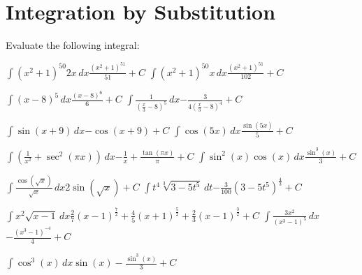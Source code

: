 
\section{Integration by Substitution}

\noindent Evaluate the following integral:

\pairofprobsans%
{$\displaystyle \int (x^2 + 1)^{50} 2x \,dx$}{$\displaystyle \frac{(x^2 + 1)^{51}}{51} + C$}%
{$\displaystyle \int (x^2 + 1)^{50} x \,dx$}{$\displaystyle \frac{(x^2 + 1)^{51}}{102} + C$}%

\pairofprobsans%
{$\displaystyle \int \left(x - 8\right)^5\,dx$}{$\displaystyle \frac{\left(x-8\right)^6}{6} + C$}%
{$\displaystyle \int \frac{1}{\left(\frac{x}{3} - 8\right)^5}\,dx$}{$\displaystyle -\frac{3}{4(\frac{x}{3} -8)^4} + C$}%

\pairofprobsans%
{$\displaystyle \int \sin{(x+9)} \,dx$}{$\displaystyle -\cos{(x + 9)} + C$}%
{$\displaystyle \int \cos{(5x)} \,dx$}{$\displaystyle \frac{\sin{(5x)}}{5} + C$}%

\newpage
\pairofprobsans%
{$\displaystyle \int \left( \frac{1}{x^2} +\sec^2(\pi x) \right) \,dx$}{$\displaystyle -\frac{1}{x} + \frac{\tan{(\pi x)}}{\pi}+ C$}%
{$\displaystyle \int \sin^2{(x)} \cos{(x)}  \,dx$}{$\displaystyle \frac{\sin^3{(x)}}{3} + C$}%

\pairofprobsans%
{$\displaystyle \int \frac{\cos{(\sqrt{x})}}{\sqrt{x}} \,dx$}{$\displaystyle 2\sin{\left(\sqrt{x}\right)} + C$}%
{$\displaystyle \int t^4 \sqrt[3]{3 - 5t^5}  \,dt$}{$\displaystyle -\frac{3}{100} \left(3-5t^5 \right)^\frac{4}{3} + C$}%

\newpage
\pairofprobsans%
{$\displaystyle \int x^2\sqrt{x-1} \,dx$}{$\displaystyle \frac{2}{7}(x-1)^\frac{7}{2} + \frac{4}{5}(x+1)^\frac{5}{2} + \frac{2}{3}(x-1)^\frac{3}{2} + C$}%
{$\displaystyle \int \frac{3x^2}{\left( x^3 - 1 \right)^5} \,dx$}{$\displaystyle -\frac{\left( x^3 - 1 \right)^{-4}}{4} + C$}%

\problemans%
{$\displaystyle \int \cos^3{(x)}  \,dx$}{$\displaystyle \sin{(x)} - \frac{\sin^3{(x)}}{3} + C$}%

